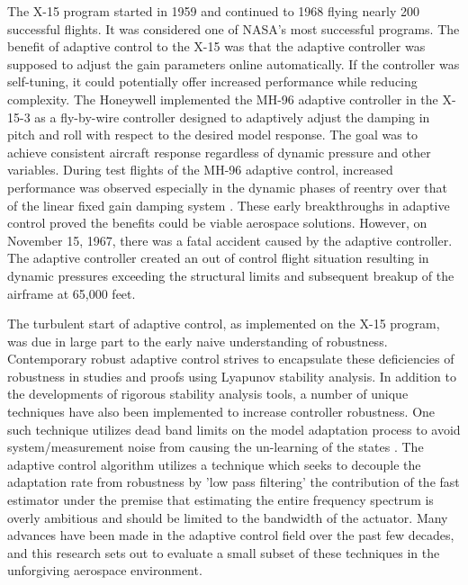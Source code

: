 The X-15 program started in 1959 and continued to 1968 flying nearly 200 successful flights.  It was considered one of NASA's most successful programs.  The benefit of adaptive control to the X-15 was that the adaptive controller was supposed to adjust the gain parameters online automatically.  If the controller was self-tuning, it could potentially offer increased performance while reducing complexity.  The Honeywell implemented the MH-96 adaptive controller in the X-15-3 as a fly-by-wire controller designed to adaptively adjust the damping in pitch and roll with respect to the desired model response.  The goal was to achieve consistent aircraft response regardless of dynamic pressure and other variables.  During test flights of the MH-96 adaptive control, increased performance was observed especially in the dynamic phases of reentry over that of the linear fixed gain damping system \cite{dydek2010adaptive}.  These early breakthroughs in adaptive control proved the benefits could be viable aerospace solutions.  However, on November 15, 1967, there was a fatal accident caused by the adaptive controller.  The adaptive controller created an out of control flight situation resulting in dynamic pressures exceeding the structural limits and subsequent breakup of the airframe at 65,000 feet.

The turbulent start of adaptive control, as implemented on the X-15 program, was due in large part to the early naive understanding of robustness.  Contemporary robust adaptive control strives to encapsulate these deficiencies of robustness in studies and proofs using Lyapunov stability analysis.  In addition to the developments of rigorous stability analysis tools, a number of unique techniques have also been implemented to increase controller robustness.  One such technique utilizes dead band limits on the model adaptation process to avoid system/measurement noise from causing the un-learning of the states \cite{lavretsky2013robust}.  The \Lone adaptive control algorithm utilizes a technique which seeks to decouple the adaptation rate from robustness by 'low pass filtering' the contribution of the fast estimator under the premise that estimating the entire frequency spectrum is overly ambitious and should be limited to the bandwidth of the actuator.  Many advances have been made in the adaptive control field over the past few decades, and this research sets out to evaluate a small subset of these techniques in the unforgiving aerospace environment.





